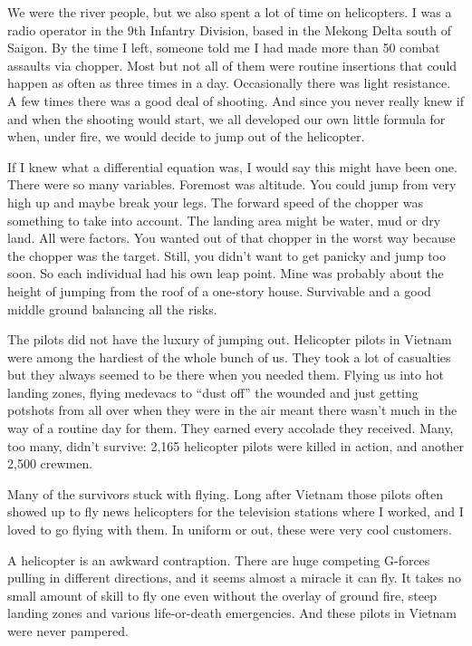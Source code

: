 We were the river people, but we also spent a lot of time on
helicopters. I was a radio operator in the 9th Infantry Division, based
in the Mekong Delta south of Saigon. By the time I left, someone told me
I had made more than 50 combat assaults via chopper. Most but not all of
them were routine insertions that could happen as often as three times
in a day. Occasionally there was light resistance. A few times there was
a good deal of shooting. And since you never really knew if and when the
shooting would start, we all developed our own little formula for when,
under fire, we would decide to jump out of the helicopter.

If I knew what a differential equation was, I would say this might have
been one. There were so many variables. Foremost was altitude. You could
jump from very high up and maybe break your legs. The forward speed of
the chopper was something to take into account. The landing area might
be water, mud or dry land. All were factors. You wanted out of that
chopper in the worst way because the chopper was the target. Still, you
didn't want to get panicky and jump too soon. So each individual had his
own leap point. Mine was probably about the height of jumping from the
roof of a one-story house. Survivable and a good middle ground balancing
all the risks.

The pilots did not have the luxury of jumping out. Helicopter pilots in
Vietnam were among the hardiest of the whole bunch of us. They took a
lot of casualties but they always seemed to be there when you needed
them. Flying us into hot landing zones, flying medevacs to ``dust off''
the wounded and just getting potshots from all over when they were in
the air meant there wasn't much in the way of a routine day for them.
They earned every accolade they received. Many, too many, didn't
survive: 2,165 helicopter pilots were killed in action, and another
2,500 crewmen.

Many of the survivors stuck with flying. Long after Vietnam those pilots
often showed up to fly news helicopters for the television stations
where I worked, and I loved to go flying with them. In uniform or out,
these were very cool customers.

A helicopter is an awkward contraption. There are huge competing
G-forces pulling in different directions, and it seems almost a miracle
it can fly. It takes no small amount of skill to fly one even without
the overlay of ground fire, steep landing zones and various
life-or-death emergencies. And these pilots in Vietnam were never
pampered.

